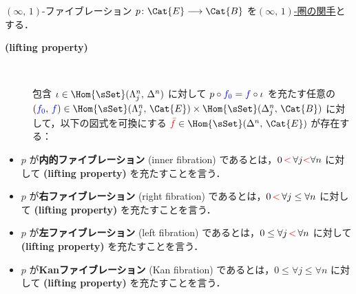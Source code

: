 \documentclass[TQFT_main]{subfiles}
\begin{document}
\begin{mydef}[label=def:infty-fib]{{$(\infty,\, 1)$}-ファイブレーション}
    $p \colon \Cat{E} \lto \Cat{B}$ を\hyperref[def:infinity-1]{$(\infty,\, 1)$-圏の関手}とする．
    \begin{description}
        \item[\textbf{(lifting property)}]　
        
        包含 $\iota \in \Hom{\sSet}(\Lambda^n_j,\, \Delta^n)$ に対して $p \circ \textcolor{blue}{f_0} = \textcolor{blue}{f} \circ \iota$ を充たす任意の $(\textcolor{blue}{f_0},\, \textcolor{blue}{f}) \in \Hom{\sSet}(\Lambda^n_j,\, \Cat{E}) \times \Hom{\sSet}(\Delta^n_j,\, \Cat{B})$ に対して，以下の図式を可換にする $\textcolor{red}{\bar{f}} \in \Hom{\sSet}(\Delta^n,\, \Cat{E})$ が存在する：
        \begin{center}
        \end{center}
    \end{description}
    \tcblower
    \begin{itemize}
        \item $p$ が\textbf{内的ファイブレーション} (inner fibration) であるとは，$0 \,\textcolor{red}{<}\, \forall j \textcolor{red}{<} \forall n$ に対して \textsf{\textbf{(lifting property)}} を充たすことを言う．
        \item $p$ が\textbf{右ファイブレーション} (right fibration) であるとは，$0 \,\textcolor{red}{<}\, \forall j \le \forall n$ に対して \textsf{\textbf{(lifting property)}} を充たすことを言う．
        \item $p$ が\textbf{左ファイブレーション} (left fibration) であるとは，$0 \le \forall j \,\textcolor{red}{<}\, \forall n$ に対して \textsf{\textbf{(lifting property)}} を充たすことを言う．
        \item $p$ が\textbf{Kanファイブレーション} (Kan fibration) であるとは，$0 \le \forall j \le \forall n$ に対して \textsf{\textbf{(lifting property)}} を充たすことを言う．
    \end{itemize}
\end{mydef}
\end{document}
